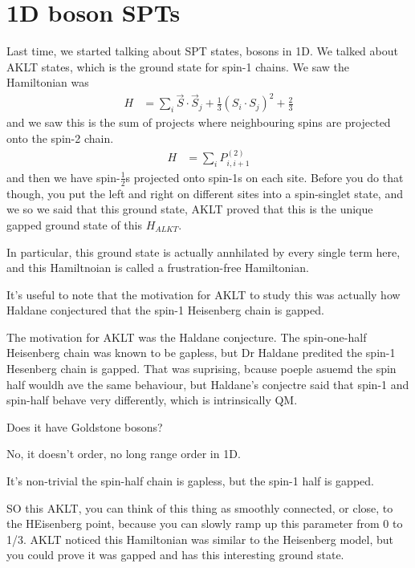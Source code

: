 \section{1D boson SPTs}
Last time,
we started talking about SPT states,
bosons in 1D.
We talked about AKLT states,
which is the ground state for spin-1 chains.
We saw the Hamiltonian was
\begin{align}
    H &= \sum_i \vec{S}\cdot\vec{S}_j
    + \frac{1}{3} \left( S_i \cdot S_j \right)^2 + \frac{2}{3}
\end{align}
and we saw this is the sum of projects where neighbouring spins are projected
onto the spin-2 chain.
\begin{align}
    H &= \sum_i P_{i,i+1}^{(2)}
\end{align}
and then we have spin-$\frac{1}{2}$s projected onto spin-1s on each site.
Before you do that though,
you put the left and right on different sites into a spin-singlet state,
and we so we said that this ground state,
AKLT proved that this is the unique gapped ground state
of this $H_{ALKT}$.

In particular, this ground state is actually annhilated by every single term
here,
and this Hamiltnoian is called a frustration-free Hamiltonian.

It's useful to note that the motivation for AKLT to study this was actually how
Haldane conjectured that the spin-1 Heisenberg chain is gapped.

The motivation for AKLT was the Haldane conjecture.
The spin-one-half Heisenberg chain was known to be gapless,
but Dr Haldane predited the spin-1 Hesenberg chain is gapped.
That was suprising,
bcause poeple asuemd the spin half wouldh ave the same behaviour,
but Haldane's conjectre said that spin-1 and spin-half behave very
differently,
which is intrinsically QM.

\begin{question}
    Does it have Goldstone bosons?
\end{question}
No, it doesn't order, no long range order in 1D.

It's non-trivial the spin-half chain is gapless,
but the  spin-1 half is gapped.

SO this AKLT,
you can think of this thing as smoothly connected,
or close,
to the HEisenberg point,
because you can slowly ramp up this parameter from 0 to 1/3.
AKLT noticed this Hamiltonian was similar to the Heisenberg model,
but you could prove it was gapped and has this interesting ground state.

